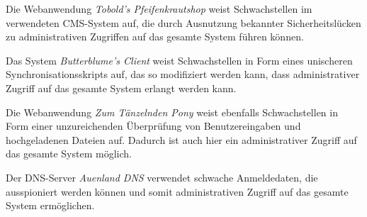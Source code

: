 \noindent Die Webanwendung \textit{Tobold's Pfeifenkrautshop} weist Schwachstellen im verwendeten CMS-System auf, die durch Ausnutzung bekannter Sicherheitslücken zu administrativen Zugriffen auf das gesamte System führen können.

\noindent Das System \textit{Butterblume's Client} weist Schwachstellen in Form eines unischeren Synchronisationsskripts auf, das so modifiziert werden kann, dass administrativer Zugriff auf das gesamte System erlangt werden kann.

\noindent Die Webanwendung \textit{Zum Tänzelnden Pony} weist ebenfalls Schwachstellen in Form einer unzureichenden Überprüfung von Benutzereingaben und hochgeladenen Dateien auf. Dadurch ist auch hier ein administrativer Zugriff auf das gesamte System möglich.

\noindent Der DNS-Server \textit{Auenland DNS} verwendet schwache Anmeldedaten, die ausspioniert werden können und somit administrativen Zugriff auf das gesamte System ermöglichen.